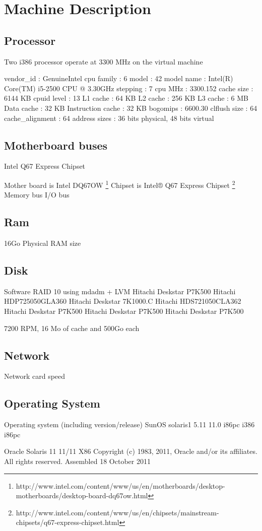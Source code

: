\section{Machine Description}

\subsection{Processor}

  	Two i386 processor operate at 3300 MHz on the virtual machine


	vendor_id			: GenuineIntel
	cpu family			: 6
	model				: 42
	model name			: Intel(R) Core(TM) i5-2500 CPU @ 3.30GHz
	stepping			: 7
	cpu MHz			: 3300.152
	cache size			: 6144 KB
	cpuid level		: 13
	L1 cache			: 64 KB
	L2 cache			: 256 KB
	L3 cache			: 6 MB
	Data cache			: 32 KB
	Instruction cache	: 32 KB
	bogomips			: 6600.30
	clflush size		: 64
	cache_alignment		: 64
	address sizes		: 36 bits physical, 48 bits virtual



\subsection{Motherboard buses}
	Intel Q67 Express Chipset


Mother board is Intel DQ67OW
\footnote{http://www.intel.com/content/www/us/en/motherboards/desktop-motherboards/desktop-board-dq67ow.html}
Chipset is Intel® Q67 Express Chipset \footnote{http://www.intel.com/content/www/us/en/chipsets/mainstream-chipsets/q67-express-chipset.html}
    Memory bus
    I/O bus

\subsection{Ram}
	16Go Physical
    RAM size

\subsection{Disk}
	Software RAID 10 using mdadm + LVM
Hitachi Deskstar P7K500 Hitachi HDP725050GLA360
Hitachi Deskstar 7K1000.C Hitachi HDS721050CLA362
Hitachi Deskstar P7K500
Hitachi Deskstar P7K500
Hitachi Deskstar P7K500

7200 RPM, 16 Mo of cache and 500Go each

\subsection{Network}
    Network card speed

\subsection{Operating System}
    Operating system (including version/release) 
SunOS solaris1 5.11 11.0 i86pc i386 i86pc

                           Oracle Solaris 11 11/11 X86
  Copyright (c) 1983, 2011, Oracle and/or its affiliates.  All rights reserved.
                            Assembled 18 October 2011

